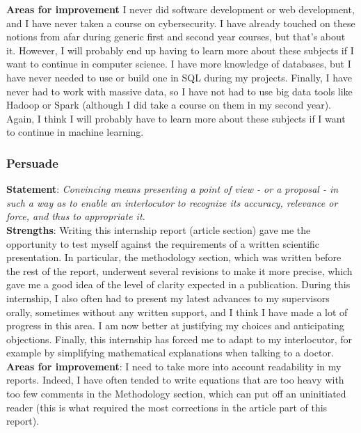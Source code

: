 \documentclass[preprint,12pt]{elsarticle}
\begin{document}
\textbf{Areas for improvement} I never did software development or web development, and I have never taken a course on cybersecurity. I have already touched on these notions from afar during generic first and second year courses, but that's about it. However, I will probably end up having to learn more about these subjects if I want to continue in computer science. I have more knowledge of databases, but I have never needed to use or build one in SQL during my projects. Finally, I have never had to work with massive data, so I have not had to use big data tools like Hadoop or Spark (although I did take a course on them in my second year). Again, I think I will probably have to learn more about these subjects if I want to continue in machine learning.

\subsubsection{Persuade}

\noindent \textbf{Statement}: \textit{Convincing means presenting a point of view - or a proposal - in such a way as to enable an interlocutor to recognize its accuracy, relevance or force, and thus to appropriate it.}\\[3 pt]

\noindent \textbf{Strengths}: Writing this internship report (article section) gave me the opportunity to test myself against the requirements of a written scientific presentation. In particular, the methodology section, which was written before the rest of the report, underwent several revisions to make it more precise, which gave me a good idea of the level of clarity expected in a publication. During this internship, I also often had to present my latest advances to my supervisors orally, sometimes without any written support, and I think I have made a lot of progress in this area. I am now better at justifying my choices and anticipating objections. Finally, this internship has forced me to adapt to my interlocutor, for example by simplifying mathematical explanations when talking to a doctor.\\[3 pt]

\noindent \textbf{Areas for improvement}: I need to take more into account readability in my reports. Indeed, I have often tended to write equations that are too heavy with too few comments in the Methodology section, which can put off an uninitiated reader (this is what required the most corrections in the article part of this report).
\end{document}
